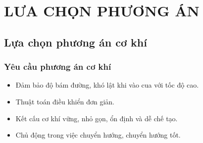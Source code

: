 \chapter{LƯA CHỌN PHƯƠNG ÁN}
    \section{Lựa chọn phương án cơ khí}
        \subsection{Yêu cầu phương án cơ khí}
            \begin{itemize}
                \item Đảm bảo độ bám đường, khó lật khi vào cua với tốc độ cao.
                \item Thuật toán điều khiển đơn giản.
                \item Kết cấu cơ khí vững, nhỏ gọn, ổn định và dễ chế tạo.
                \item Chủ động trong việc chuyển hướng, chuyển hướng tốt. 
            \end{itemize}
